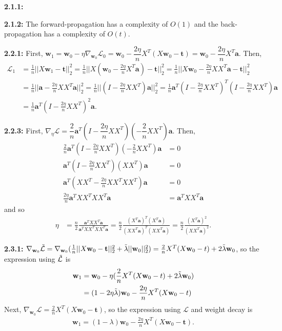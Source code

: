 \documentclass[12pt]{article}
\newcommand{\m}[1]{\mathbf{#1}}
\begin{document}
\textbf{2.1.1:}
\begin{center}\end{center}

\textbf{2.1.2:} The forward-propagation has a complexity of $O(1)$ and the back-propagation has a complexity of $O(t)$.

\textbf{2.2.1:} First, $\m w_1 = \m w_0 - \eta \nabla_{\m w_0} \mathcal{L}_0 = \m w_0 - \dfrac{2\eta}{n}X^T(X\m w_0 - \m t) = \m w_0 - \dfrac{2\eta}{n}X^T\m a$. Then, \begin{align*}
    \mathcal{L}_1 &= \frac{1}{n}||X\m w_1 - \m t||^2_2 = \frac{1}{n}||X(\m w_0 - \frac{2\eta}{n}X^T\m a) - \m t||^2_2 = \frac{1}{n}||X\m w_0 - \frac{2\eta}{n}XX^T\m a - \m t||^2_2\\
    &= \frac{1}{n}||\m a - \frac{2\eta}{n}XX^T\m a||^2_2 = \frac{1}{n}||(I - \frac{2\eta}{n}XX^T)\m a||^2_2 = \frac{1}{n}\m a^T(I - \frac{2\eta}{n}XX^T)^T(I - \frac{2\eta}{n}XX^T)\m a\\
    &= \frac{1}{n}\m a^T(I - \frac{2\eta}{n}XX^T)^2\m a.
\end{align*}

\textbf{2.2.3:} First, $\nabla_\eta \mathcal{L} = \dfrac{2}{n}\m a^T(I - \dfrac{2\eta}{n}XX^T)(-\dfrac{2}{n}XX^T)\m a$. Then, \begin{align*}
    \frac{2}{n}\m a^T(I - \frac{2\eta}{n}XX^T)(-\frac{2}{n}XX^T)\m a &= 0\\
    \m a^T(I - \frac{2\eta}{n}XX^T)(XX^T)\m a &= 0\\
    \m a^T(XX^T - \frac{2\eta}{n}XX^TXX^T)\m a &= 0\\
    \frac{2\eta}{n}\m a^TXX^TXX^T\m a &= \m a^TXX^T\m a
\end{align*} and so \begin{align*}
    \eta &= \frac{n}{2}\frac{\m a^TXX^T\m a}{\m a^TXX^TXX^T\m a} = \frac{n}{2}\frac{(X^T\m a)^T(X^T\m a)}{(XX^T\m a)^T(XX^T\m a)} = \frac{n}{2}\frac{(X^T\m a)^2}{(XX^T\m a)^2}.
\end{align*}

\textbf{2.3.1:} $\nabla_{\m w_0} \Tilde{\mathcal{L}} = \nabla_{\m w_0} (\frac{1}{n}||X\m w_0 - \m t||^2_2 + \Tilde{\lambda}||\m w_0||^2_2) = \frac{2}{n}X^T(X\m w_0 - t) + 2\Tilde{\lambda}\m w_0$, so the expression using $\Tilde{\mathcal{L}}$ is \begin{align*}
    \m w_1 &= \m w_0 - \eta(\frac{2}{n}X^T(X\m w_0 - t) + 2\Tilde{\lambda}\m w_0)\\
    &= (1 - 2\eta\Tilde{\lambda})\m w_0 - \frac{2\eta}{n}X^T(X\m w_0 - t)
\end{align*} Next, $\nabla_{\m w_0} \mathcal{L} = \frac{2}{n}X^T(X\m w_0 - \m t)$, so the expression using $\mathcal{L}$ and weight decay is \begin{align*}
    \m w_1 = (1-\lambda)\m w_0 - \frac{2\eta}{n}X^T(X\m w_0 - \m t).
\end{align*}
\end{document}
